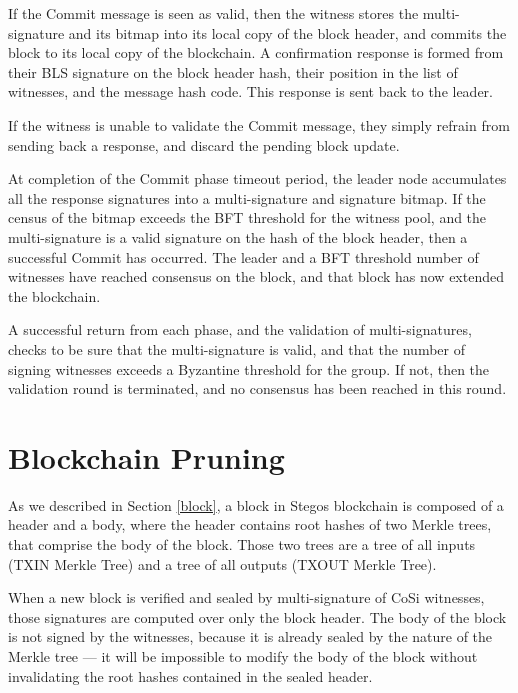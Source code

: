 \documentclass[a4paper, 10pt, conference]{ieeeconf}
\begin{document}
\begin{itemize}
{{	\item{If the Commit message is seen as valid, then the witness stores the multi-signature and its bitmap into its local copy of the block header, and commits the block to its local copy of the blockchain. A confirmation response is formed from their BLS signature on the block header hash, their position in the list of witnesses, and the message hash code. This response is sent back to the leader.}

	\item{If the witness is unable to validate the Commit message, they simply refrain from sending back a response, and discard the pending block update.}}

	\item{At completion of the Commit phase timeout period, the leader node accumulates all the response signatures into a multi-signature and signature bitmap. If the census of the bitmap exceeds the BFT threshold for the witness pool, and the multi-signature is a valid signature on the hash of the block header, then a successful Commit has occurred. The leader and a BFT threshold number of witnesses have reached consensus on the block, and that block has now extended the blockchain.}
	}
\end{itemize}

A successful return from each phase, and the validation of multi-signatures, checks to be sure that the multi-signature is valid, and that the number of signing witnesses exceeds a Byzantine threshold for the group. If not, then the validation round is terminated, and no consensus has been reached in this round.

\section{Blockchain Pruning}\label{pruning}

As we described in Section \ref{block}, a block in Stegos blockchain is composed of a header and a body, where the header contains root hashes of two Merkle trees, that comprise the body of the block. Those two trees are a tree of all inputs (TXIN Merkle Tree) and a tree of all outputs (TXOUT Merkle Tree). 

When a new block is verified and sealed by multi-signature of CoSi witnesses, those signatures are computed over only the block header. The body of the block is not signed by the witnesses, because it is already sealed by the nature of the Merkle tree --- it will be impossible to modify the body of the block without invalidating the root hashes contained in the sealed header.
\end{document}
